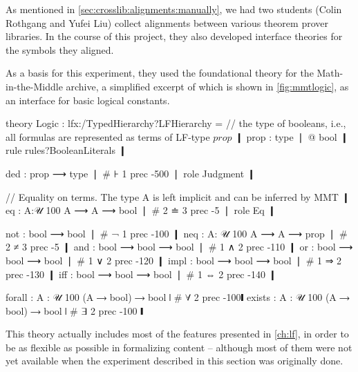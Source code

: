 As mentioned in \autoref{sec:crosslib:alignments:manually}, we had two students (Colin Rothgang and Yufei Liu) collect alignments between various theorem prover libraries. In the course of this project, they also developed interface theories for the symbols they aligned.

As a basis for this experiment, they used the foundational theory for the Math-in-the-Middle archive, a simplified excerpt of which is shown in \autoref{fig:mmtlogic}, as an interface for basic logical constants.

\begin{mmtcode}[caption= {An Interface Theory for Logic in \mmt\protect\footnotemark},label=fig:mmtlogic]
theory Logic : lfx:/TypedHierarchy?LFHierarchy =
	 // the type of booleans, i.e., all formulas are represented as terms of LF-type $prop$ ❙
	 prop 	: type ❘ @ bool  ❙
	 rule rules?BooleanLiterals ❙

	 ded 	: prop ⟶ type			❘ # ⊦ 1 prec -500 ❘ role Judgment ❙
	 
	 // Equality on terms. The type A is left implicit and can be inferred by MMT ❙
	 eq 	: {A:𝒰 100} A ⟶ A ⟶ bool	❘ # 2 ≐ 3 prec -5 ❘ role Eq ❙
	 
	 not  	: bool ⟶ bool 			❘ # ¬ 1 prec -100 ❙
	 neq 	: {A: 𝒰 100} A ⟶ A ⟶ prop	❘ # 2 ≠ 3 prec -5 ❙
	 and  	: bool ⟶ bool ⟶ bool		❘ # 1 ∧ 2 prec -110 ❙
	 or 	: bool ⟶ bool ⟶ bool		❘ # 1 ∨ 2 prec -120 ❙
	 impl	: bool ⟶ bool ⟶ bool		❘ # 1 ⇒ 2 prec -130 ❙
	 iff 	: bool ⟶ bool ⟶ bool		❘ # 1 ⇔ 2 prec -140 ❙
   
	 forall : {A : 𝒰 100} (A ⟶ bool) ⟶ bool	❘ # ∀ 2 prec -100❙
	 exists : {A : 𝒰 100} (A ⟶ bool) ⟶ bool	❘ # ∃ 2 prec -100 ❙
\end{mmtcode}

This theory actually includes most of the features presented in \autoref{ch:lf}, in order to be as flexible as possible in formalizing content -- although most of them were not yet available when the experiment described in this section was originally done.


